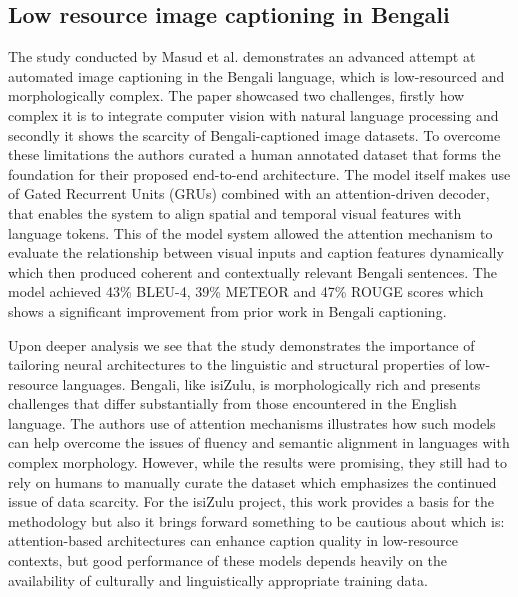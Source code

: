 \documentclass{article}
\begin{document}
\subsection{Low resource image captioning in Bengali}
The study conducted by Masud et al.\cite{masud2025image} demonstrates an advanced attempt at automated image captioning in the Bengali language, which is low-resourced and morphologically complex. The paper showcased two challenges, firstly how complex it is to integrate computer vision with natural language processing and secondly it shows the scarcity of Bengali-captioned image datasets. To overcome these limitations the authors curated a human annotated dataset that forms the foundation for their proposed end-to-end architecture. The model itself makes use of Gated Recurrent Units (GRUs) combined with an attention-driven decoder, that enables the system to align spatial and temporal visual features with language tokens. This of the model system allowed the attention mechanism to evaluate the relationship between visual inputs and caption features dynamically which then produced coherent and contextually relevant Bengali sentences. The model achieved 43\% BLEU-4, 39\% METEOR and 47\% ROUGE scores which shows a significant improvement from prior work in Bengali captioning.

Upon deeper analysis we see that the study demonstrates the importance of tailoring neural architectures to the linguistic and structural properties of low-resource languages. Bengali, like isiZulu, is morphologically rich and presents challenges that differ substantially from those encountered in the English language. The authors use of attention mechanisms illustrates how such models can help overcome the issues of fluency and semantic alignment in languages with complex morphology. However, while the results were promising, they still had to rely on humans to manually curate the dataset which emphasizes the continued issue of data scarcity. For the isiZulu project, this work provides a basis for the methodology but also it brings forward something to be cautious about which is: attention-based architectures can enhance caption quality in low-resource contexts, but good performance of these models depends heavily on the availability of culturally and linguistically appropriate training data.
\end{document}
